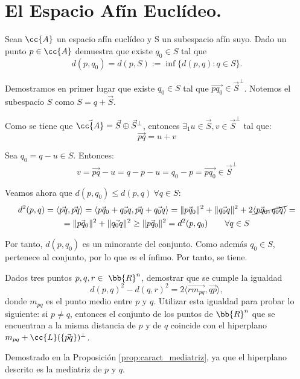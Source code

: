 \section{El Espacio Afín Euclídeo.}\label{Rel:Tema2}

\begin{ejercicio}
    Sean $\cc{A}$ un espacio afín euclídeo y S un subespacio afín suyo. Dado un punto $p \in \cc{A}$ demuestra que existe $q_0 \in S$ tal que
    \begin{equation*}
        d(p, q_0) = d(p, S) := \inf\{d(p, q) : q \in S\}.
    \end{equation*}

    Demostramos en primer lugar que existe $q_0 \in S$ tal que $\vec{pq_0}\in \vec{S}^\perp$.
    Notemos el subespacio $S$ como $S=q+\vec{S}$.
    
    Como se tiene que $\vec{\cc{A}}=\vec{S}\oplus \vec{S}^\perp$, entonces $\exists_1 u\in \vec{S}, v\in \vec{S}^\perp$ tal que:
    \begin{equation*}
        \vec{pq} = u+v
    \end{equation*}

    Sea $q_0=q-u\in S$. Entonces:
    \begin{equation*}
        v = \vec{pq}-u = q-p-u = q_0-p = \vec{pq_0} \in \vec{S}^\perp
    \end{equation*}

    Veamos ahora que $d(p,q_0)\leq d(p,q)~ \forall q\in S$:
    \begin{multline*}
        d^2(p,q) = \langle\vec{pq}, \vec{pq}\rangle
        = \langle\vec{pq_0} + \vec{q_0q}, \vec{pq}+ \vec{q_0q}\rangle
        = \|\vec{pq_0}\|^2 + \|\vec{q_0q}\|^2 + 2\cancel{\langle\vec{pq_0}, \vec{q_0q}\rangle} =\\= \|\vec{pq_0}\|^2 + \|\vec{q_0q}\|^2 \geq \|\vec{pq_0}\|^2 = d^2(p,q_0) \qquad \forall q\in S
    \end{multline*}

    Por tanto, $d(p,q_0)$ es un minorante del conjunto. Como además $q_0\in S$, pertenece al conjunto, por lo que es el ínfimo. Por tanto, se tiene.
\end{ejercicio}

\begin{ejercicio} Dados tres puntos $p, q, r \in~\bb{R}^n$, demostrar que se cumple la igualdad
    \begin{equation*}
        d(p,q)^2 - d(q,r)^2 = 2\langle\vec{rm_{pq}}, \vec{qp}\rangle,
    \end{equation*}
    donde $m_{pq}$ es el punto medio entre $p$ y $q$. Utilizar esta igualdad para probar lo siguiente: si $p \neq q$, entonces el conjunto de los puntos de $\bb{R}^n$ que se encuentran a la misma distancia de $p$ y de $q$ coincide con el hiperplano $m_{pq} + \cc{L}(\{\vec{p q}\})^\perp$.

    Demostrado en la Proposición \ref{prop:caract_mediatriz}, ya que el hiperplano descrito es la mediatriz de $p$ y $q$.
\end{ejercicio}

